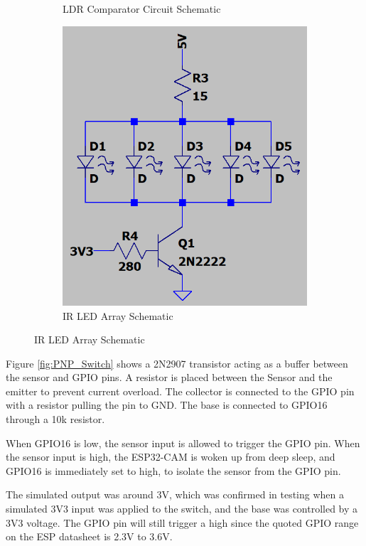 \documentclass[class=report,11pt,crop=false]{standalone}
\begin{document}
\begin{figure}[hbt!]
\begin{subfigure}[b]{0.4\textwidth}
        \caption{LDR Comparator Circuit Schematic}
        \label{fig:LDR_schem}
    \end{subfigure}
    \hfill
    \begin{subfigure}[b]{0.25\textwidth}
        \includegraphics[width=\linewidth]{Images/IR_LED_Array.png}
        \caption{IR LED Array Schematic}
        \label{fig:LED_schem}
    \end{subfigure}
\end{figure}

Figure \ref{fig:PNP_Switch} shows a 2N2907 transistor acting as a buffer between the sensor and GPIO pins. A resistor is placed between the Sensor and the emitter to prevent current overload. The collector is connected to the GPIO pin with a resistor pulling the pin to GND. The base is connected to GPIO16 through a 10k resistor. 

When GPIO16 is low, the sensor input is allowed to trigger the GPIO pin. When the sensor input is high, the ESP32-CAM is woken up from deep sleep, and GPIO16 is immediately set to high, to isolate the sensor from the GPIO pin. 

The simulated output was around 3V, which was confirmed in testing when a simulated 3V3 input was applied to the switch, and the base was controlled by a 3V3 voltage. The GPIO pin will still trigger a high since the quoted GPIO range on the ESP datasheet is 2.3V to 3.6V. 
\end{document}
